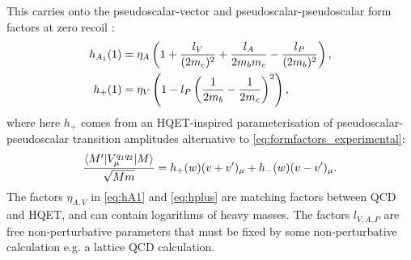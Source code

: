 This carries onto the pseudoscalar-vector and pseudoscalar-pseudoscalar form factors at zero recoil \cite{Falk:1992wt}:
\begin{align}
  \label{eq:hA1}
  h_{A_1}(1) &= \eta_A \left( 1 + {l_V\over (2m_c)^2} + {l_A\over 2m_b m_c} - {l_P\over (2m_b)^2} \right), \\
  h_+(1) &= \eta_V \left( 1 - l_P \left( {1\over 2m_b} - {1\over 2m_c} \right)^2 \right),
  \label{eq:hplus}
\end{align}
where here $h_+$ comes from an HQET-inspired parameterisation of pseudoscalar-pseudoscalar transition amplitudes alternative to \eqref{eq:formfactors_experimental}:
\begin{align}
  {\langle M' | V^{q_1q_2}_{\mu} | M \rangle \over \sqrt{Mm}} = h_+(w)(v+v')_{\mu} + h_-(w)(v-v')_{\mu}.
  \label{eq:pseudoscalar_hqet}
\end{align}
The factors $\eta_{A,V}$ in \eqref{eq:hA1} and \eqref{eq:hplus} are matching factors between QCD and HQET, and can contain logarithms of heavy masses. The factors $l_{V,A,P}$ are free non-perturbative parameters that must be fixed by some non-perturbative calculation e.g. a lattice QCD calculation.



